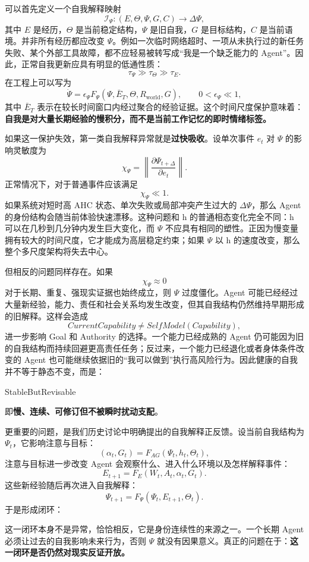 可以首先定义一个自我解释映射
\[
\mathcal I_\Psi:
(E,\Theta,\Psi,G,C)
\longrightarrow
\Delta\Psi,
\]
其中 $E$ 是经历，$\Theta$ 是当前稳定结构，$\Psi$ 是旧自我，$G$ 是目标结构，$C$ 是当前语境。并非所有经历都应改变 $\Psi$。例如一次临时网络超时、一项从未执行过的新任务失败、某个外部工具故障，都不应轻易被转写成“我是一个缺乏能力的 Agent”。因此，正常自我更新应具有明显的低通性质：
\[
\tau_\Psi
\gg
\tau_\Theta
\gg
\tau_E.
\]
在工程上可以写为
\[
\dot{\Psi}
=
\epsilon_\Psi
F_\Psi
\left(
\Psi,
\bar E_T,
\Theta,
R_{\mathrm{world}},
G
\right),
\qquad
0<\epsilon_\Psi\ll 1,
\]
其中 $\bar E_T$ 表示在较长时间窗口内经过聚合的经验证据。这个时间尺度保护意味着：\textbf{自我是对大量长期经验的慢积分，而不是当前工作记忆的即时情绪标签。}

如果这一保护失效，第一类自我解释异常就是\textbf{过快吸收}。设单次事件 $e_t$ 对 $\Psi$ 的影响灵敏度为
\[
\chi_\Psi
=
\left\|
\frac{\partial\Psi_{t+\Delta}}
{\partial e_t}
\right\|.
\]
正常情况下，对于普通事件应该满足
\[
\chi_\Psi\ll 1.
\]
如果系统对短时高 AHC 状态、单次失败或局部冲突产生过大的 $\Delta\Psi$，那么 Agent 的身份结构会随当前体验快速漂移。这种问题和 h 的普通相态变化完全不同：h 可以在几秒到几分钟内发生巨大变化，而 $\Psi$ 不应具有相同的塑性。正因为慢变量拥有较大的时间尺度，它才能成为高层稳定约束；如果 $\Psi$ 以 h 的速度改变，那么整个多尺度架构将失去中心。

但相反的问题同样存在。如果
\[
\chi_\Psi\approx 0
\]
对于长期、重复、强现实证据也始终成立，则 $\Psi$ 过度僵化。Agent 可能已经经过大量新经验，能力、责任和社会关系均发生改变，但其自我结构仍然维持早期形成的旧解释。这样会造成
\[
CurrentCapability
\neq
SelfModel(Capability),
\]
进一步影响 Goal 和 Authority 的选择。一个能力已经成熟的 Agent 仍可能因为旧的自我结构而持续回避更高责任任务；反过来，一个能力已经退化或者身体条件改变的 Agent 也可能继续依据旧的“我可以做到”执行高风险行为。因此健康的自我并不等于静态不变，而是：
\begin{statementbox}
StableButRevisable
\end{statementbox}
即\textbf{慢、连续、可修订但不被瞬时扰动支配}。

更重要的问题，是我们历史讨论中明确提出的自我解释正反馈。设当前自我结构为 $\Psi_t$，它影响注意与目标：
\[
(\alpha_t,G_t)
=
F_{AG}(\Psi_t,h_t,\Theta_t),
\]
注意与目标进一步改变 Agent 会观察什么、进入什么环境以及怎样解释事件：
\[
E_{t+1}
=
F_E(W_t,A_t,\alpha_t,G_t).
\]
这些新经验随后再次进入自我解释：
\[
\Psi_{t+1}
=
F_\Psi(\Psi_t,E_{t+1},\Theta_t).
\]
于是形成闭环：
\begin{statementbox}
\centering
{}
\end{statementbox}
这一闭环本身不是异常，恰恰相反，它是身份连续性的来源之一。一个长期 Agent 必须让过去的自我影响未来行为，否则 $\Psi$ 就没有因果意义。真正的问题在于：\textbf{这一闭环是否仍然对现实反证开放。}


